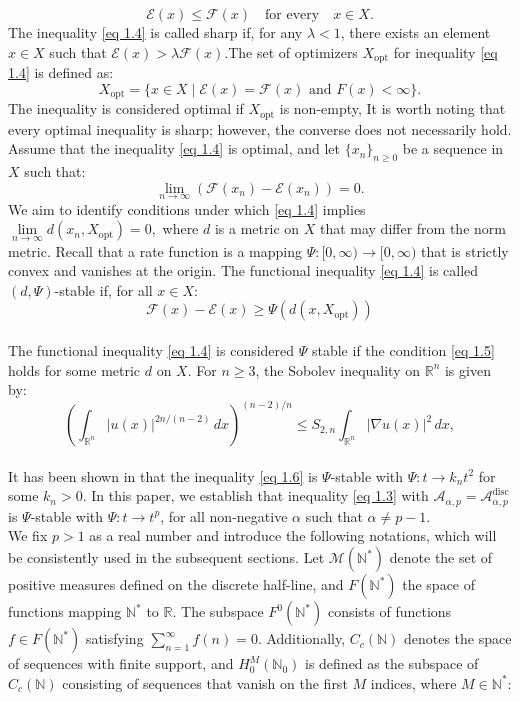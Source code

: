 \documentclass[11pt]{amsart}
\newcommand{\1}{[1]}
\begin{document}
\begin{equation}
\mathcal{E}(x) \leq \mathcal{F}(x) \quad \text{for every} \quad x \in X.
\tag{1.4} \label{eq 1.4}
\end{equation}
The inequality \eqref{eq 1.4} is called sharp if, for any \(\lambda < 1\), there exists an element \(x \in X\) such that \(\mathcal{E}(x) > \lambda \mathcal{F}(x)\).The set of optimizers  $X_{\text{opt}}$ for inequality \eqref{eq 1.4} is defined as:
$$
X_{\text{opt}} = \{x \in X \mid \mathcal{E}(x) = \mathcal{F}(x) \text{ and } F(x) < \infty\}.
$$
The inequality is considered optimal if \(X_{\text{opt}}\) is non-empty, It is worth noting that every optimal inequality is sharp; however, the converse does not necessarily hold. Assume that the inequality \eqref{eq 1.4} is optimal, and let \(\{x_{n}\}_{n\geq 0}\) be a sequence in \(X\) such that: $$\lim\limits _{n\to\infty}(\mathcal{F}(x_{n})-\mathcal{E}(x_{n}))=0.$$
We aim to identify conditions under which \eqref{eq 1.4} implies
$\lim\limits_{n\to\infty}d(x_{n}, X_{\text{opt}})=0,$ where $d$ is a metric on \(X\) that may differ from the norm metric. Recall that a rate function is a mapping $\Psi: [0, \infty) \rightarrow [0, \infty)$ that is strictly convex and vanishes at the origin. The functional inequality \eqref{eq 1.4} is called $(d, \Psi)$-stable if, for all $x \in X:$
\begin{equation}
\mathcal{F} (x) - \mathcal{E}(x) \geq \Psi(d(x, X_{\text{opt}})) \tag{1.5} \label{eq 1.5}
\end{equation}
\phantom{.} \\ 
The functional inequality
\eqref{eq 1.4} is considered $\Psi$ stable if the condition \eqref{eq 1.5} holds for some metric $d$ on $X.$ For $n \geq 3$, the Sobolev inequality on $\mathbb{R}^n$ is given by:
\begin{equation}\left(\int_{\mathbb{R}^{n}}|u(x)|^{2n/(n-2)}\,dx\right)^{(n-2)/n} \leq S_{2,n} \int_{\mathbb{R}^{n}}|\nabla u(x)|^{2}\,dx, \tag{1.6} \label{eq 1.6}
\end{equation}
\phantom{.} \\ 
It has been shown in \cite{Bian18} that the inequality \eqref{eq 1.6} is $\Psi$-stable with $\Psi: t \to  k_{n} t^2$ for some $k_{n} > 0$. In this paper, we establish that inequality \eqref{eq 1.3} with $\mathcal{A}_{\alpha,p} = \mathcal{A}_{\alpha,p}^{\text{disc}}$ is $\Psi$-stable with $\Psi: t \to t^{p}$, for all non-negative \( \alpha \) such that \( \alpha \neq p-1 \). \\ 
We fix $p > 1$ as a real number and introduce the following notations, which will be consistently used in the subsequent sections. Let $\mathcal{M}(\mathbb{N}^{*})$ denote the set of positive measures defined on the discrete half-line, and $F(\mathbb{N}^{*})$ the space of functions mapping $\mathbb{N}^{*}$ to $\mathbb{R}$. The subspace $F^{0}(\mathbb{N}^{*})$ consists of functions $f \in F(\mathbb{N}^{*})$ satisfying $\displaystyle \sum_{n=1}^{\infty} f(n) = 0$. Additionally, $C_{c}(\mathbb{N})$ denotes the space of sequences with finite support, and $H^{M}_{0}(\mathbb{N}_{0})$ is defined as the subspace of $C_{c}(\mathbb{N})$ consisting of sequences that vanish on the first $M$ indices, where $M \in \mathbb{N}^{*}$: \\
\end{document}
